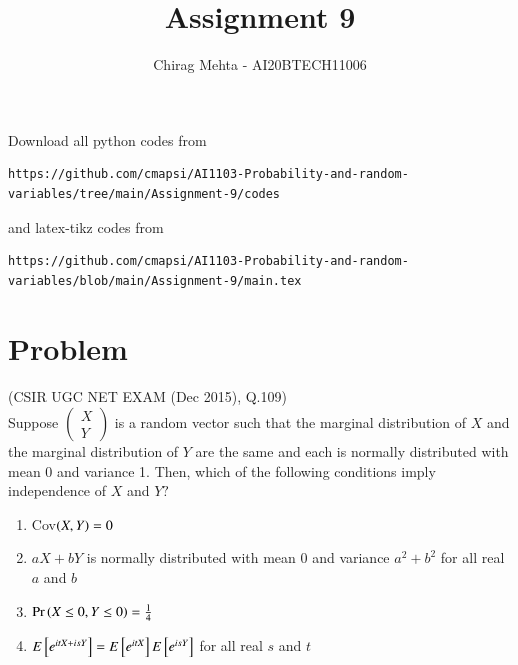 \documentclass[journal,12pt,twocolumn]{IEEEtran}
\begin{document}
     \def\rightbox#1{\makebox[0in][r]{#1}}
     \def\centbox#1{\makebox[0in]{#1}}
     \def\topbox#1{\raisebox{-\baselineskip}[0in][0in]{#1}}
     \def\midbox#1{\raisebox{-0.5\baselineskip}[0in][0in]{#1}}
\vspace{3cm}
\title{Assignment 9}
\author{Chirag Mehta - AI20BTECH11006}
\maketitle
\newpage
\bigskip
\renewcommand{\thefigure}{\theenumi}
\renewcommand{\thetable}{\theenumi}
Download all python codes from 
\begin{lstlisting}
https://github.com/cmapsi/AI1103-Probability-and-random-variables/tree/main/Assignment-9/codes
\end{lstlisting}
and latex-tikz codes from 
\begin{lstlisting}
https://github.com/cmapsi/AI1103-Probability-and-random-variables/blob/main/Assignment-9/main.tex
\end{lstlisting}
\section{Problem}
(CSIR UGC NET EXAM (Dec 2015), Q.109)\\
Suppose
$\begin{pmatrix}
X\\
Y
\end{pmatrix}$ is a random vector such that the marginal distribution of $X$ and the marginal distribution of $Y$ are the same and each is normally distributed with mean 0 and variance 1. Then, which of the following conditions imply independence of $X$ and $Y?$
\begin{enumerate}
\item Cov$\left(X,Y\right)=0$
\item $aX+bY$ is normally distributed with mean 0 and variance $a^2+b^2$ for all real $a$ and $b$
\item $\Pr\left(X\le 0, Y\le0\right)=\frac{1}{4}$
\item $E{}\left[e^{itX+isY}\right]=E{}\left[e^{itX}\right]E{}\left[e^{isY}\right]$ for all real $s$ and $t$
\end{enumerate}
\end{document}
